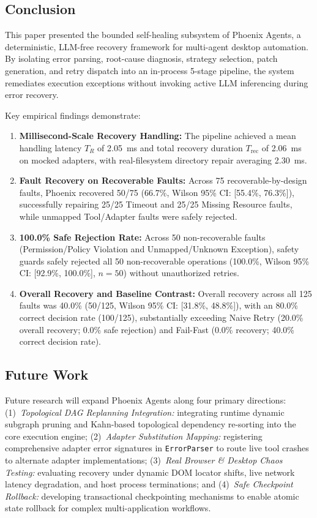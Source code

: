 \documentclass[conference]{IEEEtran}
\newcommand{\chg}[1]{{\color{blue}#1}}
\begin{document}
\subsection{Conclusion}
This paper presented the bounded self-healing subsystem of Phoenix Agents, a deterministic, LLM-free recovery framework for multi-agent desktop automation. By isolating error parsing, root-cause diagnosis, strategy selection, patch generation, and retry dispatch into an in-process 5-stage pipeline, the system remediates execution exceptions without invoking active LLM inferencing during error recovery.

Key \chg{empirical} findings demonstrate:
\begin{enumerate}
    \item \chg{\textbf{Millisecond-Scale Recovery Handling:} The pipeline achieved a mean handling latency $T_R$ of 2.05~ms and total recovery duration $T_{\text{rec}}$ of 2.06~ms on mocked adapters, with real-filesystem directory repair averaging 2.30~ms.}
    \item \chg{\textbf{Fault Recovery on Recoverable Faults:} Across 75 recoverable-by-design faults, Phoenix recovered 50/75 (66.7\%, Wilson 95\% CI: [55.4\%, 76.3\%]), successfully repairing 25/25 Timeout and 25/25 Missing Resource faults, while unmapped Tool/Adapter faults were safely rejected.}
    \item \chg{\textbf{100.0\% Safe Rejection Rate:} Across 50 non-recoverable faults (Permission/Policy Violation and Unmapped/Unknown Exception), safety guards safely rejected all 50 non-recoverable operations (100.0\%, Wilson 95\% CI: [92.9\%, 100.0\%], $n=50$) without unauthorized retries.}
    \item \chg{\textbf{Overall Recovery and Baseline Contrast:} Overall recovery across all 125 faults was 40.0\% (50/125, Wilson 95\% CI: [31.8\%, 48.8\%]), with an 80.0\% correct decision rate (100/125), substantially exceeding Naive Retry (20.0\% overall recovery; 0.0\% safe rejection) and Fail-Fast (0.0\% recovery; 40.0\% correct decision rate).}
\end{enumerate}

\subsection{Future Work}
\chg{Future research will expand Phoenix Agents along four primary directions:
(1)~\textit{Topological DAG Replanning Integration:} integrating runtime dynamic subgraph pruning and Kahn-based topological dependency re-sorting into the core execution engine;
(2)~\textit{Adapter Substitution Mapping:} registering comprehensive adapter error signatures in \texttt{ErrorParser} to route live tool crashes to alternate adapter implementations;
(3)~\textit{Real Browser \& Desktop Chaos Testing:} evaluating recovery under dynamic DOM locator shifts, live network latency degradation, and host process terminations; and
(4)~\textit{Safe Checkpoint Rollback:} developing transactional checkpointing mechanisms to enable atomic state rollback for complex multi-application workflows.}
\end{document}
